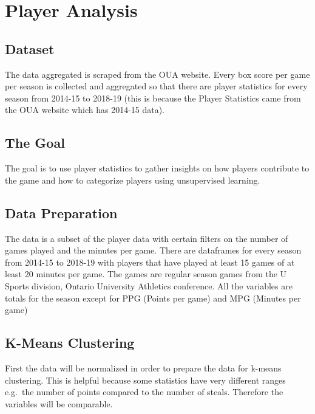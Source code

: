 \documentclass[]{book}
\begin{document}
\hypertarget{player-analysis}{%
\chapter{Player Analysis}\label{player-analysis}}

\hypertarget{dataset}{%
\section{Dataset}\label{dataset}}

The data aggregated is scraped from the OUA website. Every box score per game per season is collected and aggregated so that there are player statistics for every season from 2014-15 to 2018-19 (this is because the Player Statistics came from the OUA website which has 2014-15 data).

\hypertarget{the-goal}{%
\section{The Goal}\label{the-goal}}

The goal is to use player statistics to gather insights on how players contribute to the game and how to categorize players using unsupervised learning.

\hypertarget{data-preparation}{%
\section{Data Preparation}\label{data-preparation}}

The data is a subset of the player data with certain filters on the number of games played and the minutes per game. There are dataframes for every season from 2014-15 to 2018-19 with players that have played at least 15 games of at least 20 minutes per game. The games are regular season games from the U Sports division, Ontario University Athletics conference. All the variables are totals for the season except for PPG (Points per game) and MPG (Minutes per game)

\hypertarget{k-means-clustering}{%
\section{K-Means Clustering}\label{k-means-clustering}}

First the data will be normalized in order to prepare the data for k-means clustering. This is helpful because some statistics have very different ranges e.g.~the number of points compared to the number of steals. Therefore the variables will be comparable.
\end{document}
